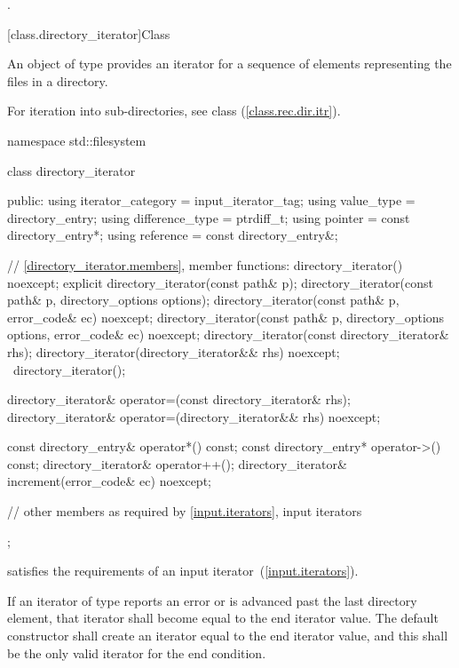 \begin{itemdescr}
\pnum
\returns {}.
\end{itemdescr}

[class.directory_iterator]{Class }

%
\pnum
An object of type  provides an iterator for a
sequence of  elements representing the files in a
directory.
\begin{note} For iteration into sub-directories, see class 
(\ref{class.rec.dir.itr}). \end{note}

\begin{codeblock}
namespace std::filesystem {
  class directory_iterator {
  public:
    using iterator_category = input_iterator_tag;
    using value_type        = directory_entry;
    using difference_type   = ptrdiff_t;
    using pointer           = const directory_entry*;
    using reference         = const directory_entry&;

    // \ref{directory_iterator.members}, member functions:
    directory_iterator() noexcept;
    explicit directory_iterator(const path& p);
    directory_iterator(const path& p, directory_options options);
    directory_iterator(const path& p, error_code& ec) noexcept;
    directory_iterator(const path& p, directory_options options,
                       error_code& ec) noexcept;
    directory_iterator(const directory_iterator& rhs);
    directory_iterator(directory_iterator&& rhs) noexcept;
   ~directory_iterator();

    directory_iterator& operator=(const directory_iterator& rhs);
    directory_iterator& operator=(directory_iterator&& rhs) noexcept;

    const directory_entry& operator*() const;
    const directory_entry* operator->() const;
    directory_iterator&    operator++();
    directory_iterator&    increment(error_code& ec) noexcept;

    // other members as required by \ref{input.iterators}, input iterators
  };
}
\end{codeblock}

\pnum
  satisfies the requirements of an input
iterator~(\ref{input.iterators}).

\pnum
If an iterator of type  reports an error or
is advanced past the last directory element,
that iterator shall become equal to the end iterator
value. The  default constructor shall
create an iterator equal to the end iterator value, and this shall be the only
valid iterator for the end condition.


